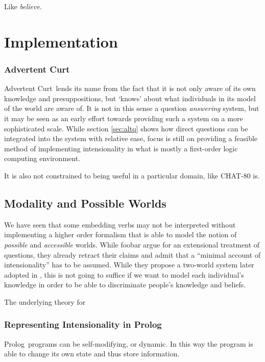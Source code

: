 \documentclass[12pt,a4paper]{article}
\newcommand{\pn}{\textsf} %
\newcommand{\acurt}{\pn{Advertent Curt}\mbox{ }}
\newcommand{\prol}{\pn{Prolog}\mbox{ }}
\theoremstyle{remark} \newtheorem*{termin}{Terminology} %
\begin{document}
Like \emph{believe}.

\section{Implementation}

\subsubsection{Advertent Curt}

\acurt lends its name from the fact that it is not only aware of its own
knowledge and presuppositions, but `knows' about what individuals in its
model of the world are aware of. It is not in this sense a question
\emph{answering} system, but it may be seen as an early effort towards providing
such a system on a more sophisticated scale. While section \ref{sec:altq} shows
how direct questions can be integrated into the system with relative ease, focus
is still on providing a feasible method of implementing intensionality in what
is mostly a first-order logic computing environment.


It is also not constrained to being useful in a particular domain, like
\pn{CHAT-80} is.

\subsection{Modality and Possible Worlds}
\label{sec:indices}

We have seen that some embedding verbs may not be interpreted without
implementing a higher order formalism that is able to model the notion of
\emph{possible} and \emph{accessible} worlds. While foobar %
argue for an extensional treatment of questions, they already %
retract their claims and admit that a ``minimal account of intensionality'' has
to be assumed. While they propose a two-world system later adopted in
\cite{g:is}, this is not going to suffice if we want to model each individual's
knowledge in order to be able to discriminate people's knowledge and beliefs.

The underlying theory for 

\subsubsection{Representing Intensionality in \prol}

\prol programs can be self-modifying, or dynamic. In this way the program is
able to change its own state and thus store information.
\end{document}
